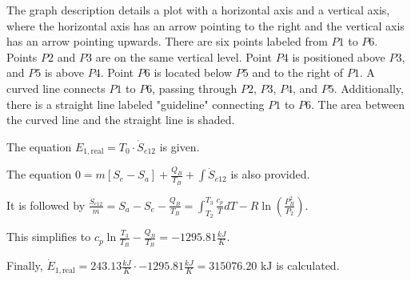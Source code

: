 The graph description details a plot with a horizontal axis and a vertical axis, where the horizontal axis has an arrow pointing to the right and the vertical axis has an arrow pointing upwards. There are six points labeled from \( P1 \) to \( P6 \). Points \( P2 \) and \( P3 \) are on the same vertical level. Point \( P4 \) is positioned above \( P3 \), and \( P5 \) is above \( P4 \). Point \( P6 \) is located below \( P5 \) and to the right of \( P1 \). A curved line connects \( P1 \) to \( P6 \), passing through \( P2 \), \( P3 \), \( P4 \), and \( P5 \). Additionally, there is a straight line labeled "guideline" connecting \( P1 \) to \( P6 \). The area between the curved line and the straight line is shaded.

The equation \( E_{1, \text{real}} = T_0 \cdot \dot{S}_{e12} \) is given.

The equation \( 0 = m \left[ S_e - S_a \right] + \frac{Q_B}{T_B} + \int \dot{S}_{e12} \) is also provided.

It is followed by \( \frac{\dot{S}_{e12}}{m} = S_a - S_e - \frac{Q_B}{T_B} = \int_{T_2}^{T_3} \frac{c_p}{T} dT - R \ln \left( \frac{P_B^2}{P_2} \right) \).

This simplifies to \( c_p \ln \frac{T_3}{T_B} - \frac{Q_B}{T_B} = -1295.81 \frac{kJ}{K} \).

Finally, \( \dot{E}_{1, \text{real}} = 243.13 \frac{kJ}{K} \cdot -1295.81 \frac{kJ}{K} = 315076.20 \text{ kJ} \) is calculated.